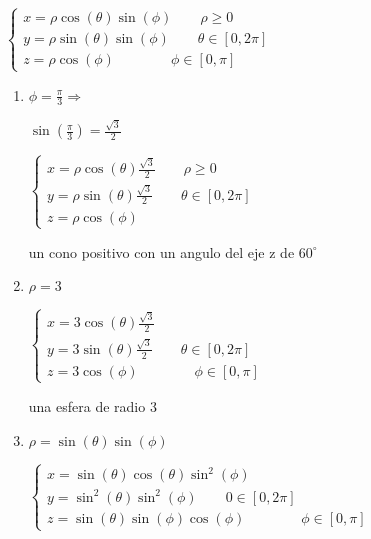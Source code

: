 \documentclass[../practica_09.tex]{subfiles}
\begin{document}
    $\left \{\begin{array}{ll}
        x = \rho\cos(\theta)\sin(\phi) \qquad \rho \geq 0\\
        y = \rho\sin(\theta)\sin(\phi) \qquad \theta \in [0, 2\pi]\\
        z = \rho\cos(\phi) \qquad\qquad \phi \in [0,\pi]
    \end{array} \right.$

    \begin{enumerate}
        \item $\phi = \frac{\pi}{3} \Rightarrow$

            $\sin(\frac{\pi}{3}) = \frac{\sqrt{3}}{2}$

            $\left \{\begin{array}{ll}
                x = \rho\cos(\theta)\frac{\sqrt{3}}{2} \qquad \rho \geq 0\\
                y = \rho\sin(\theta)\frac{\sqrt{3}}{2} \qquad \theta \in [0, 2\pi]\\
                z = \rho\cos(\phi)
            \end{array} \right.$

            un cono positivo con un angulo del eje z de $60^{\circ}$

        \item $\rho = 3$

            $\left \{\begin{array}{ll}
                x = 3\cos(\theta)\frac{\sqrt{3}}{2}\\
                y = 3\sin(\theta)\frac{\sqrt{3}}{2} \qquad \theta \in [0, 2\pi]\\
                z = 3\cos(\phi)  \qquad\qquad \phi \in [0,\pi]
            \end{array} \right.$

            una esfera de radio 3
    
        \item $\rho = \sin(\theta)\sin(\phi)$

            $\left \{\begin{array}{ll}
                x = \sin(\theta)\cos(\theta)\sin^2(\phi) \\
                y = \sin^2(\theta)\sin^2(\phi) \qquad 0 \in [0, 2\pi] \\
                z = \sin(\theta)\sin(\phi)\cos(\phi) \qquad\qquad \phi \in [0,\pi]
            \end{array} \right.$


    \end{enumerate}
\end{document}
